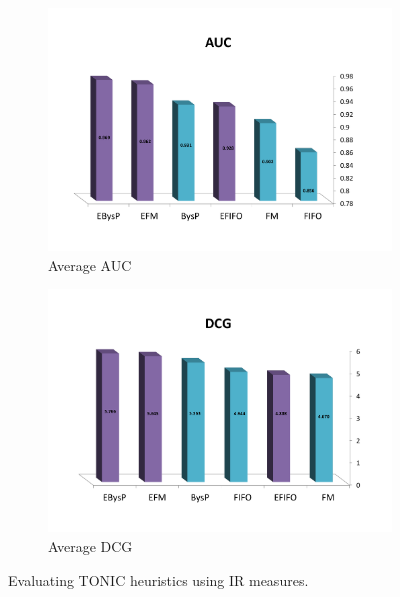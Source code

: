 \documentclass[journal]{IEEEtran}
\begin{document}
\begin{figure}
\centering
\begin{subfigure}{.5\textwidth}
  \centering
\includegraphics[width=\linewidth,  trim={2.0cm 2.5cm 2.5cm 5.5cm},clip]{AUC_ALL.pdf}
\caption{Average AUC}
\label{fig:auc}
\end{subfigure}%
\begin{subfigure}{.5\textwidth}
  \centering
\includegraphics[width=\linewidth,  trim={2.0cm 2.5cm 2.5cm 5.5cm},clip]{DCG_AllAlgo.pdf}
\caption{Average DCG}
\label{fig:dcg}
\end{subfigure}
\caption{Evaluating TONIC heuristics using IR measures.}
\label{fig:auc-and-dcg}
\end{figure}
\end{document}
